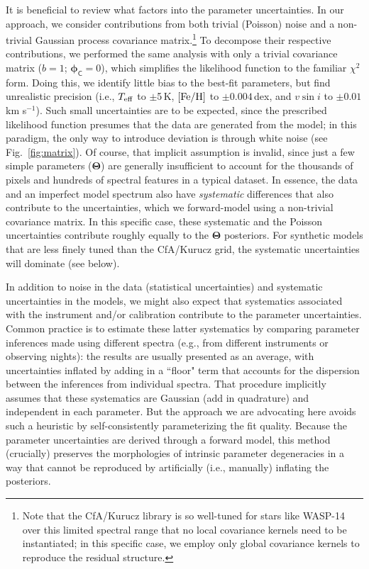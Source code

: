 \documentclass[iop,floatfix]{emulateapj}
\newcommand{\vT}{ {\bm \Theta}}
\newcommand{\vp}{ {\bm \phi}}
\newcommand{\cov}{ \vp_{\mathsf{C}}}
\begin{document}
It is beneficial to review what factors into the parameter uncertainties.  In our approach, we 
consider contributions from both trivial (Poisson) noise and a non-trivial Gaussian process 
covariance matrix.\footnote{Note that the {\sc CfA/Kurucz} library is so well-tuned for stars like 
WASP-14 over this limited spectral range that no local covariance kernels need to be instantiated; 
in this specific case, we employ only global covariance kernels to reproduce the residual 
structure.} To decompose their respective contributions, we performed the same analysis with only a 
trivial covariance matrix ($b = 1$; $\cov = 0$), which simplifies the likelihood function to the 
familiar $\chi^2$ form.  Doing this, we identify little bias to the best-fit parameters, but find 
unrealistic precision (i.e., $T_{\rm eff}$ to $\pm$5\,K, $[{\rm Fe/H}]$ to $\pm0.004$\,dex, and $v 
\sin i$ to $\pm0.01$\,km s$^{-1}$).  Such small uncertainties are to be expected, since the 
prescribed likelihood function presumes that the data are generated from the model; in this 
paradigm, the only way to introduce deviation is through white noise (see Fig.~\ref{fig:matrix}).  
Of course, that implicit assumption is invalid, since just a few simple parameters ($\vT$) are 
generally insufficient to account for the thousands of pixels and hundreds of spectral features in 
a typical dataset.  In essence, the data and an imperfect model spectrum also have {\it systematic} 
differences that also contribute to the uncertainties, which we forward-model using a non-trivial 
covariance matrix.  In this specific case, these systematic and the Poisson uncertainties 
contribute roughly equally to the $\vT$ posteriors.  For synthetic models that are less finely 
tuned than the {\sc CfA/Kurucz} grid, the systematic uncertainties will dominate (see below). 

In addition to noise in the data (statistical uncertainties) and systematic uncertainties in the 
models, we might also expect that systematics associated with the instrument and/or calibration 
contribute to the parameter uncertainties.  Common practice is to estimate these latter systematics 
by comparing parameter inferences made using different spectra (e.g., from different instruments or 
observing nights): the results are usually presented as an average, with uncertainties inflated by 
adding in a ``floor" term that accounts for the dispersion between the inferences from individual 
spectra.  That procedure implicitly assumes that these systematics are Gaussian (add in quadrature) 
and independent in each parameter.  But the approach we are advocating here avoids such a heuristic 
by self-consistently parameterizing the fit quality.  Because the parameter uncertainties are 
derived through a forward model, this method (crucially) preserves the morphologies of intrinsic 
parameter degeneracies in a way that cannot be reproduced by artificially (i.e., manually) 
inflating the posteriors.  
\end{document}
